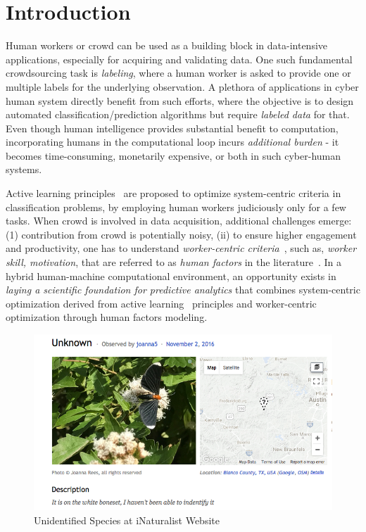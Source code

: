 \vspace{-0.2in}
\section{Introduction}\label{intro}

\vspace{-0.1in}


 Human workers or crowd can  be  used  as  a  building  block  in data-intensive applications, especially for acquiring and  validating data. One such fundamental crowdsourcing task is {\em labeling}, where a human worker is asked to provide one or multiple labels for the underlying observation. A plethora of applications in cyber human system directly benefit from such efforts, where the objective is to design automated classification/prediction algorithms but require {\em labeled data} for that. Even though human intelligence provides substantial benefit to computation, incorporating humans in the computational loop incurs {\em additional burden} - it becomes time-consuming, monetarily expensive, or both in such cyber-human systems. 
 
Active learning principles~\cite{al1,al2} are proposed to optimize system-centric criteria in classification problems, by employing human workers judiciously only for a few tasks. When crowd is involved in data acquisition, additional challenges emerge: (1) contribution from crowd is potentially noisy, (ii) to ensure  higher engagement and productivity, one has to understand {\em worker-centric criteria}~\cite{martin2014being}, such as, {\em worker skill, motivation}, that are referred to as {\em human factors} in the literature~\cite{amer2016human,hf1,motiv1,motiv2}. In a hybrid human-machine computational environment, an opportunity exists in {\em laying a scientific foundation for predictive analytics} that combines system-centric optimization derived from active learning~\cite{al1,al2} principles and worker-centric optimization through human factors modeling. 

\begin{figure}
\centering
\includegraphics[scale=0.3]{figures/unknown.png}
\caption{\label{fig:unknown} \small Unidentified Species at iNaturalist Website}
\end{figure} 

